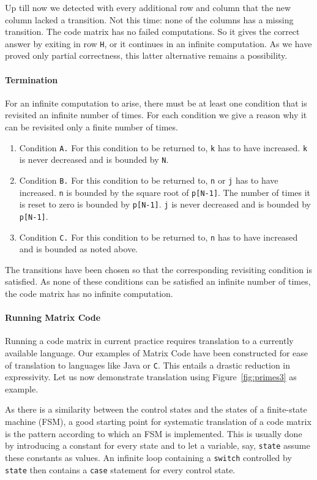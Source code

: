 \documentclass[preprint,11pt]{elsarticle}
\begin{document}
Up till now we detected with every additional
row and column that the new column lacked a transition.
Not this time: none of the columns has a missing transition.
The code matrix has no failed computations.
So it gives the correct answer by exiting in row \verb"H",
or it continues in an infinite computation.
As we have proved only partial correctness,
this latter alternative remains a possibility.

\paragraph{Termination}
For an infinite computation to arise,
there must be at least one condition
that is revisited an infinite number of times.
For each condition we give a reason why
it can be revisited only a finite number of times.

\begin{enumerate}
\item
Condition {\tt A.}
For this condition to be returned to,
{\tt k} has to have increased.
{\tt k} is never decreased and is bounded by {\tt N}.

\item
Condition {\tt B.}
For this condition to be returned to,
{\tt n} or {\tt j} has to have increased.
{\tt n} is bounded by the square root of 
{\tt p[N-1]}.
The number of times it is reset to zero is bounded by
{\tt p[N-1]}.
{\tt j} is never decreased and is bounded by {\tt p[N-1]}.
\item
Condition {\tt C.}
For this condition to be returned to,
{\tt n} has to have increased and is bounded as noted above.
\end{enumerate}

The transitions have been chosen
so that the corresponding revisiting condition
is satisfied.
As none of these conditions can be satisfied
an infinite number of times,
the code matrix has no infinite computation.

\paragraph{Running Matrix Code}
Running a code matrix in current practice
requires translation to a currently available language.
Our examples of Matrix Code have been constructed
for ease of translation to languages like Java or {\tt C}.
This entails a drastic reduction in expressivity.
Let us now demonstrate translation
using Figure~\ref{fig:primes3} as example.

As there is a similarity between the control states
and the states of a finite-state machine (FSM),
a good starting point for systematic translation
of a code matrix is the pattern according to which
an FSM is implemented.
This is usually done by introducing a constant for every
state and to let a variable, say, \verb"state"
assume these constants as values.
An infinite loop containing a \verb"switch" controlled by
\verb"state" then contains a \verb"case" statement
for every control state.
\end{document}
